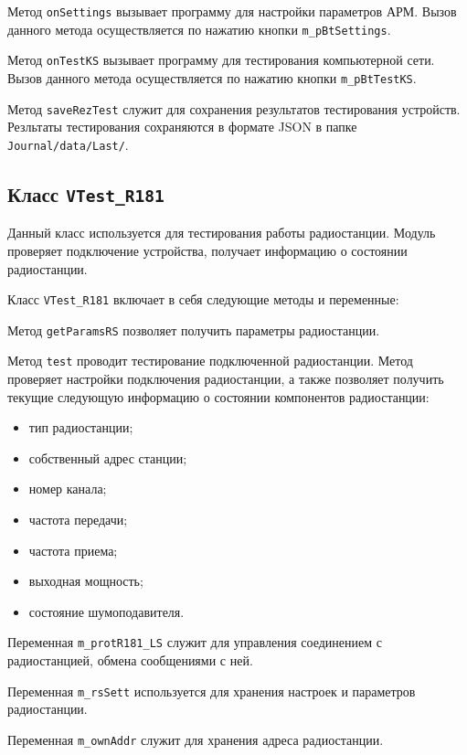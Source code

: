 \begin{enum}
	\item Метод \texttt{onSettings} вызывает программу для настройки параметров АРМ.
		Вызов данного метода осуществляется по нажатию кнопки\break
		\texttt{m\_pBtSettings}.

	\item Метод \texttt{onTestKS} вызывает программу для тестирования компьютерной сети.
		Вызов данного метода осуществляется по нажатию кнопки\break
		\texttt{m\_pBtTestKS}.

	\item Метод \texttt{saveRezTest} служит для сохранения результатов тестирования устройств. Резльтаты
		тестирования сохраняются в формате JSON в папке \texttt{Journal/data/Last/}.
\end{enum}

\subsection{Класс \texttt{VTest\_R181}}
Данный класс используется для тестирования работы радиостанции. Модуль проверяет подключение устройства, получает
информацию о состоянии радиостанции.

Класс \texttt{VTest\_R181} включает в себя следующие методы и переменные:
\begin{enum}
	\item Метод \texttt{getParamsRS} позволяет получить параметры радиостанции.

	\item Метод \texttt{test} проводит тестирование подключенной радиостанции. Метод проверяет настройки подключения
		радиостанции, а также позволяет получить текущие следующую информацию о состоянии компонентов
		радиостанции:
		\begin{itemize}
			\item тип радиостанции;
			\item собственный адрес станции;
			\item номер канала;
			\item частота передачи;
			\item частота приема;
			\item выходная мощность;
			\item состояние шумоподавителя.
		\end{itemize}

	\item Переменная \texttt{m\_protR181\_LS} служит для управления соединением с радиостанцией, обмена сообщениями
		с ней.

	\item Переменная \texttt{m\_rsSett} используется для хранения настроек и параметров радиостанции.

	\item Переменная \texttt{m\_ownAddr} служит для хранения адреса радиостанции.
\end{enum}

